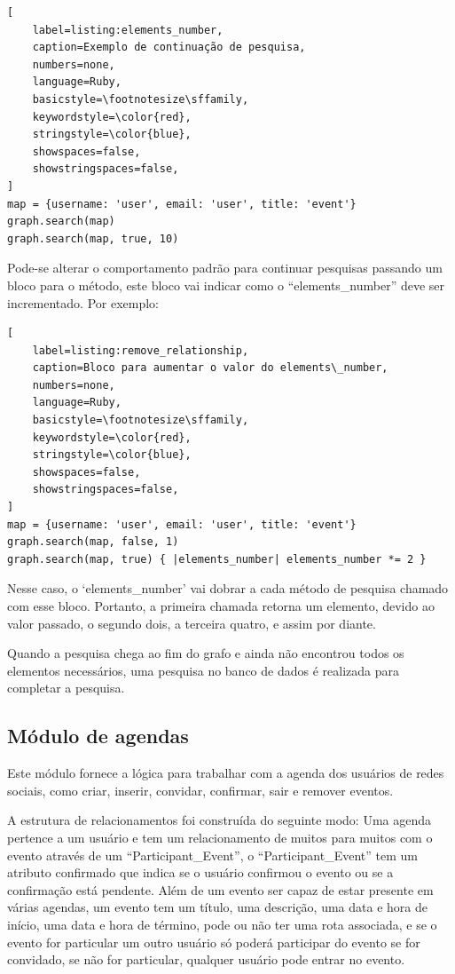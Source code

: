 \begin{lstlisting}[
    label=listing:elements_number,
    caption=Exemplo de continuação de pesquisa,
    numbers=none,
    language=Ruby,
    basicstyle=\footnotesize\sffamily,
    keywordstyle=\color{red},
    stringstyle=\color{blue},
    showspaces=false,
    showstringspaces=false,
]
map = {username: 'user', email: 'user', title: 'event'}
graph.search(map)
graph.search(map, true, 10)
\end{lstlisting}

Pode-se alterar o comportamento padrão para continuar pesquisas passando um bloco para o método, este bloco vai indicar como o ``elements\_number'' deve ser incrementado. Por exemplo:

\begin{lstlisting}[
    label=listing:remove_relationship,
    caption=Bloco para aumentar o valor do elements\_number,
    numbers=none,
    language=Ruby,
    basicstyle=\footnotesize\sffamily,
    keywordstyle=\color{red},
    stringstyle=\color{blue},
    showspaces=false,
    showstringspaces=false,
]
map = {username: 'user', email: 'user', title: 'event'}
graph.search(map, false, 1)
graph.search(map, true) { |elements_number| elements_number *= 2 }
\end{lstlisting}

Nesse caso, o `elements\_number' vai dobrar a cada método de pesquisa chamado com esse bloco. Portanto, a primeira chamada retorna um elemento, devido ao valor passado, o segundo dois, a terceira quatro, e assim por diante.

Quando a pesquisa chega ao fim do grafo e ainda não encontrou todos os elementos necessários, uma pesquisa no banco de dados é realizada para completar a pesquisa.

\subsection{Módulo de agendas}

Este módulo fornece a lógica para trabalhar com a agenda dos usuários de redes sociais, como criar, inserir, convidar, confirmar, sair e remover eventos.

A estrutura de relacionamentos foi construída do seguinte modo: Uma agenda pertence a um usuário e tem um relacionamento de muitos para muitos com o evento através de um ``Participant\_Event'', o ``Participant\_Event'' tem um atributo confirmado que indica se o usuário confirmou o evento ou se a confirmação está pendente. Além de um evento ser capaz de estar presente em várias agendas, um evento tem um título, uma descrição, uma data e hora de início, uma data e hora de término, pode ou não ter uma rota associada, e se o evento for particular um outro usuário só poderá participar do evento se for convidado, se não for particular, qualquer usuário pode entrar no evento.

